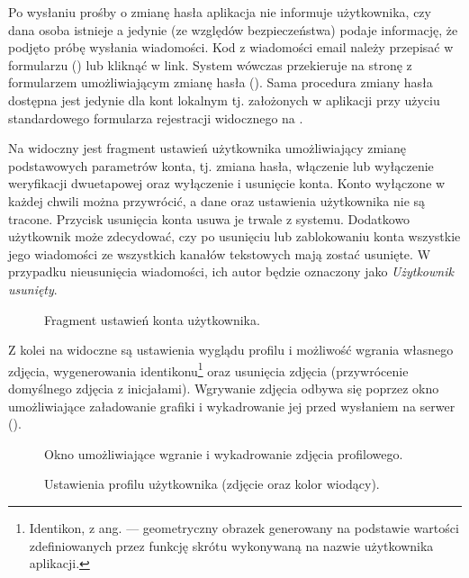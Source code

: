 Po wysłaniu prośby o zmianę hasła aplikacja nie informuje użytkownika, czy dana osoba istnieje a jedynie (ze względów
bezpieczeństwa) podaje informację, że podjęto próbę wysłania wiadomości. Kod z wiadomości email należy przepisać w
formularzu () lub kliknąć w link. System wówczas przekieruje na stronę z formularzem
umożliwiającym zmianę hasła (). Sama procedura zmiany hasła dostępna jest jedynie dla
kont lokalnym tj. założonych w aplikacji przy użyciu standardowego formularza rejestracji widocznego na
.


Na  widoczny jest fragment ustawień użytkownika umożliwiający zmianę podstawowych parametrów
konta, tj. zmiana hasła, włączenie lub wyłączenie weryfikacji dwuetapowej oraz wyłączenie i usunięcie konta. Konto
wyłączone w każdej chwili można przywrócić, a dane oraz ustawienia użytkownika nie są tracone. Przycisk usunięcia konta
usuwa je trwale z systemu. Dodatkowo użytkownik może zdecydować, czy po usunięciu lub zablokowaniu konta wszystkie jego
wiadomości ze wszystkich kanałów tekstowych mają zostać usunięte. W przypadku nieusunięcia wiadomości, ich autor będzie
oznaczony jako \textit{Użytkownik usunięty}.
%
\begin{figure}[H]
  \centering
  \caption{Fragment ustawień konta użytkownika.}
  \label{fig:user-settings}
\end{figure}

Z kolei na  widoczne są ustawienia wyglądu profilu i możliwość wgrania własnego
zdjęcia, wygenerowania identikonu\footnote{Identikon, z ang.  — geometryczny obrazek generowany na
  podstawie wartości zdefiniowanych przez funkcję skrótu wykonywaną na nazwie użytkownika aplikacji.} oraz usunięcia
zdjęcia (przywrócenie domyślnego zdjęcia z inicjałami). Wgrywanie zdjęcia odbywa się poprzez okno umożliwiające
załadowanie grafiki i wykadrowanie jej przed wysłaniem na serwer ().
%
\begin{figure}[H]
  \centering
  \begin{subfigure}[b]{0.45\textwidth}
    \centering
  \end{subfigure}
  \hfill
  \begin{subfigure}[b]{0.45\textwidth}
    \centering
  \end{subfigure}
  \caption{Okno umożliwiające wgranie i wykadrowanie zdjęcia profilowego.}
  \label{fig:add-crop-image}
\end{figure}
%
\begin{figure}[H]
  \centering
  \caption{Ustawienia profilu użytkownika (zdjęcie oraz kolor wiodący).}
  \label{fig:user-settings-colors}
\end{figure}

